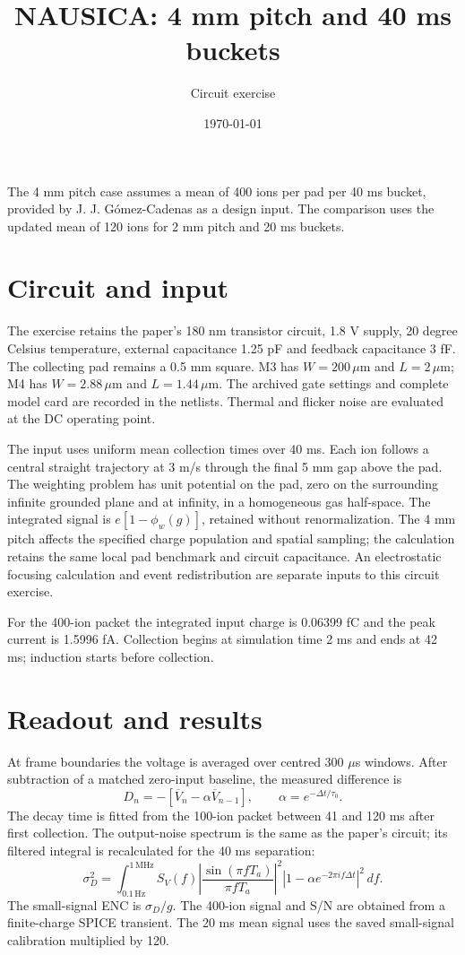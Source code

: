 \documentclass[11pt,a4paper]{article}
\title{NAUSICA: 4 mm pitch and 40 ms buckets}
\author{Circuit exercise}\date{\today}
\begin{document}
\maketitle
The 4 mm pitch case assumes a mean of 400 ions per pad per 40 ms bucket,
provided by J. J. G\'omez-Cadenas as a design input. The comparison uses the
updated mean of 120 ions for 2 mm pitch and 20 ms buckets.

\section{Circuit and input}
The exercise retains the paper's 180 nm transistor circuit, 1.8 V supply,
20 degree Celsius temperature, external capacitance 1.25 pF and feedback
capacitance 3 fF. The collecting pad remains a 0.5 mm square. M3 has
$W=200\,\mu$m and $L=2\,\mu$m; M4 has $W=2.88\,\mu$m and $L=1.44\,\mu$m.
The archived gate settings and complete model card are recorded in the netlists.
Thermal and flicker noise are evaluated at the DC operating point.

The input uses uniform mean collection times over 40 ms. Each ion follows a
central straight trajectory at 3 m/s through the final 5 mm gap above the pad.
The weighting problem has unit potential on the pad, zero on the surrounding
infinite grounded plane and at infinity, in a homogeneous gas half-space.
The integrated signal is $e[1-\phi_w(g)]$, retained without renormalization.
The 4 mm pitch affects the specified charge population and spatial sampling;
the calculation retains the same local pad benchmark and circuit capacitance.
An electrostatic focusing calculation and event redistribution are separate
inputs to this circuit exercise.

For the 400-ion packet the integrated input charge is 0.06399 fC and the
peak current is 1.5996 fA. Collection begins at simulation time 2 ms and
ends at 42 ms; induction starts before collection.

\section{Readout and results}
At frame boundaries the voltage is averaged over centred 300 $\mu$s windows.
After subtraction of a matched zero-input baseline, the measured difference is
\[
D_n=-[\overline V_n-\alpha\overline V_{n-1}],\qquad
\alpha=e^{-\Delta t/\tau_0}.
\]
The decay time is fitted from the 100-ion packet between 41 and 120 ms after
first collection. The output-noise spectrum is the same as the paper's circuit;
its filtered integral is recalculated for the 40 ms separation:
\[
\sigma_D^2=\int_{0.1\,\mathrm{Hz}}^{1\,\mathrm{MHz}}S_V(f)
\left|\frac{\sin(\pi fT_a)}{\pi fT_a}\right|^2
\left|1-\alpha e^{-2\pi i f\Delta t}\right|^2\,df.
\]
The small-signal ENC is $\sigma_D/g$. The 400-ion signal and S/N are obtained
from a finite-charge SPICE transient. The 20 ms mean signal uses the saved
small-signal calibration multiplied by 120.
\end{document}
